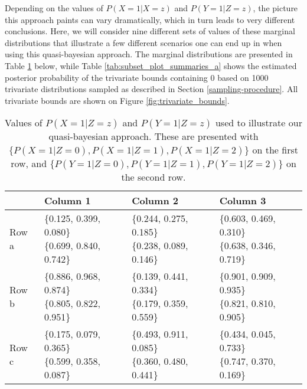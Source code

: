 \documentclass[
]{article}
\theoremstyle{plain}
\begin{document}
Depending on the values of \(P(X = 1 | X = z)\) and \(P(Y = 1 | Z = z)\), the picture this approach paints can vary dramatically, which in turn leads to very different conclusions. Here, we will consider nine different sets of values of these marginal distributions that illustrate a few different scenarios one can end up in when using this quasi-bayesian approach. The marginal distributions are presented in Table \ref{tab:subset_plot_summaries_b} below, while Table \ref{tab:subset_plot_summaries_a} shows the estimated posterior probability of the trivariate bounds containing \(0\) based on 1000 trivariate distributions sampled as described in Section \ref{sampling-procedure}. All trivariate bounds are shown on Figure \ref{fig:trivariate_bounds}.

\begin{table}[H]
  \center
  
\begin{tabular}{l|l|l|l}
\hline
  & Column 1 & Column 2 & Column 3\\
\hline
Row a & \makecell[l]{\{0.125, 0.399, 0.080\}\\\{0.699, 0.840, 0.742\}} & \makecell[c]{\{0.244, 0.275, 0.185\}\\\{0.238, 0.089, 0.146\}} & \makecell[r]{\{0.603, 0.469, 0.310\}\\\{0.638, 0.346, 0.719\}}\\
\hline
Row b & \makecell[l]{\{0.886, 0.968, 0.874\}\\\{0.805, 0.822, 0.951\}} & \makecell[c]{\{0.139, 0.441, 0.334\}\\\{0.179, 0.359, 0.559\}} & \makecell[r]{\{0.901, 0.909, 0.935\}\\\{0.821, 0.810, 0.905\}}\\
\hline
Row c & \makecell[l]{\{0.175, 0.079, 0.365\}\\\{0.599, 0.358, 0.087\}} & \makecell[c]{\{0.493, 0.911, 0.085\}\\\{0.360, 0.480, 0.441\}} & \makecell[r]{\{0.434, 0.045, 0.733\}\\\{0.747, 0.370, 0.169\}}\\
\hline
\end{tabular}


  \caption{Values of $P(X = 1 | Z = z)$ and $P(Y = 1 | Z = z)$ used to illustrate our quasi-bayesian approach. These are presented with $\{P(X = 1 | Z = 0), P(X = 1 | Z = 1), P(X = 1 | Z = 2)\}$ on the first row, and $\{P(Y = 1 | Z = 0), P(Y = 1 | Z = 1), P(Y = 1 | Z = 2)\}$ on the second row.}
  \label{tab:subset_plot_summaries_b}
\end{table}
\end{document}
